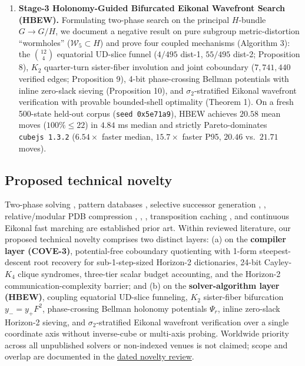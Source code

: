 \documentclass[10pt,twocolumn,letterpaper]{article}
\begin{document}
\begin{enumerate}
{  evaluation.} Across all \(57,087,450\) abstract transitions,
  \(1,935,360\) 1-form walks, \(439\) fixtures, \(139\) budget
  boundaries, a constructive multi-tier witness, and a fresh held-out
  500-state evaluation (\texttt{seed\ 0xd48a63}), potential-free
  dual-horizon compilation preserves 100\% identical outputs while
  cutting generated visits by \(68.47\%\) beyond COVE-3 (\(93.62\%\)
  vs.~scalar) and improving latency on \(499/500\) states.
\item
  \textbf{Stage-3 Holonomy-Guided Bifurcated Eikonal Wavefront Search
  (HBEW).} Formulating two-phase search on the principal \(H\)-bundle
  \(G \to G/H\), we document a negative result on pure subgroup
  metric-distortion ``wormholes'' (\(\mathcal W_5 \subset H\)) and prove
  four coupled mechanisms (Algorithm 3): the \(\binom{12}{4}\)
  equatorial UD-slice funnel (\(4/495\) dist-1, \(55/495\) dist-2;
  Proposition 8), \(K_2\) quarter-turn sister-fiber involution and joint
  coboundary (\(7,741,440\) verified edges; Proposition 9), 4-bit
  phase-crossing Bellman potentials with inline zero-slack sieving
  (Proposition 10), and \(\sigma_2\)-stratified Eikonal wavefront
  verification with provable bounded-shell optimality (Theorem 1). On a
  fresh 500-state held-out corpus (\texttt{seed\ 0x5e71a9}), HBEW
  achieves \(20.58\) mean moves (\(100\% \le 22\)) in \(4.84\) ms median
  and strictly Pareto-dominates \texttt{cubejs\ 1.3.2} (\(6.54\times\)
  faster median, \(15.7\times\) faster P95, \(20.46\) vs.~\(21.71\)
  moves).
\end{enumerate}

\hypertarget{proposed-technical-novelty}{%
\subsection{Proposed technical novelty}\label{proposed-technical-novelty}}

Two-phase solving \cite{kociemba_coordinates}, pattern databases
\cite{korf1997}, selective successor generation \cite{felner2012},
\cite{goldenberg2014}, relative/modular PDB compression
\cite{kociemba_pruning}, \cite{sturtevant2017}, \cite{breyer2010},
transposition caching \cite{akagi2010}, and continuous Eikonal fast
marching \cite{sethian1996} are established prior art. Within reviewed
literature, our proposed technical novelty comprises two distinct
layers: (a) on the \textbf{compiler layer (COVE-3)}, potential-free
coboundary quotienting with 1-form steepest-descent root recovery for
sub-1-step-sized Horizon-2 dictionaries, 24-bit Cayley-\(K_4\) clique
syndromes, three-tier scalar budget accounting, and the Horizon-2
communication-complexity barrier; and (b) on the
\textbf{solver-algorithm layer (HBEW)}, coupling equatorial UD-slice
funneling, \(K_2\) sister-fiber bifurcation \(y_- = y_+ F^2\),
phase-crossing Bellman holonomy potentials \(\Psi_r\), inline zero-slack
Horizon-2 sieving, and \(\sigma_2\)-stratified Eikonal wavefront
verification over a single coordinate axis without inverse-cube or
multi-axis probing. Worldwide priority across all unpublished solvers or
non-indexed venues is not claimed; scope and overlap are documented in
the
\href{https://github.com/nahin333/rubikscube/blob/main/research/NOVELTY.md}{dated
novelty review}.
\end{document}
